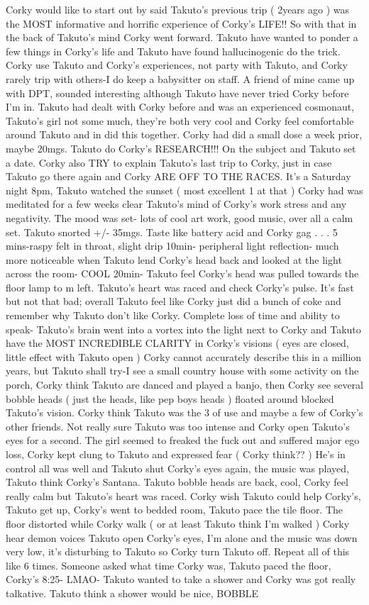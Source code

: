 \documentclass[12pt]{book}
\begin{document}
Corky would like to start out by said Takuto's previous trip ( 2years ago ) was the MOST informative and horrific experience of Corky's LIFE!! So with that in the back of Takuto's mind Corky went forward. Takuto have wanted to ponder a few things in Corky's life and Takuto have found hallucinogenic do the trick. Corky use Takuto and Corky's experiences, not party with Takuto, and Corky rarely trip with others-I do keep a babysitter on staff. A friend of mine came up with DPT, sounded interesting although Takuto have never tried Corky before I'm in. Takuto had dealt with Corky before and was an experienced cosmonaut, Takuto's girl not some much, they're both very cool and Corky feel comfortable around Takuto and in did this together. Corky had did a small dose a week prior, maybe 20mgs. Takuto do Corky's RESEARCH!!! On the subject and Takuto set a date. Corky also TRY to explain Takuto's last trip to Corky, just in case Takuto go there again and Corky ARE OFF TO THE RACES. It's a Saturday night 8pm, Takuto watched the sunset ( most excellent 1 at that ) Corky had was meditated for a few weeks clear Takuto's mind of Corky's work stress and any negativity. The mood was set- lots of cool art work, good music, over all a calm set. Takuto snorted +/- 35mgs. Taste like battery acid and Corky gag . . .  5 mins-raspy felt in throat, slight drip 10min- peripheral light reflection- much more noticeable when Takuto lend Corky's head back and looked at the light across the room- COOL 20min- Takuto feel Corky's head was pulled towards the floor lamp to m left. Takuto's heart was raced and check Corky's pulse. It's fast but not that bad; overall Takuto feel like Corky just did a bunch of coke and remember why Takuto don't like Corky. Complete loss of time and ability to speak- Takuto's brain went into a vortex into the light next to Corky and Takuto have the MOST INCREDIBLE CLARITY in Corky's visions ( eyes are closed, little effect with Takuto open ) Corky cannot accurately describe this in a million years, but Takuto shall try-I see a small country house with some activity on the porch, Corky think Takuto are danced and played a banjo, then Corky see several bobble heads ( just the heads, like pep boys heads ) floated around blocked Takuto's vision. Corky think Takuto was the 3 of use and maybe a few of Corky's other friends. Not really sure Takuto was too intense and Corky open Takuto's eyes for a second. The girl seemed to freaked the fuck out and suffered major ego loss, Corky kept clung to Takuto and expressed fear ( Corky think?? ) He's in control all was well and Takuto shut Corky's eyes again, the music was played, Takuto think Corky's Santana. Takuto bobble heads are back, cool, Corky feel really calm but Takuto's heart was raced. Corky wish Takuto could help Corky's, Takuto get up, Corky's went to bedded room, Takuto pace the tile floor. The floor distorted while Corky walk (  or at least Takuto think I'm walked ) Corky hear demon voices Takuto open Corky's eyes, I'm alone and the music was down very low, it's disturbing to Takuto so Corky turn Takuto off. Repeat all of this like 6 times. Someone asked what time Corky was, Takuto paced the floor, Corky's 8:25- LMAO- Takuto wanted to take a shower and Corky was got really talkative. Takuto think a shower would be nice, BOBBLE 
\end{document}
